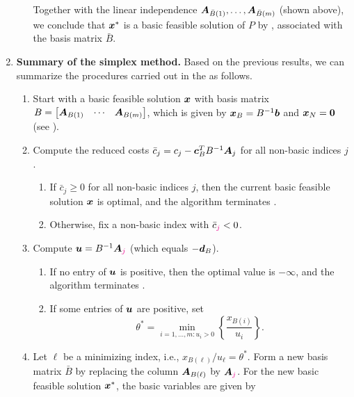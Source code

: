 \begin{enumerate}
\begin{pf}
\begin{enumerate}
Together with the linear independence
\(\bm{A}_{\bar{B}(1)},\dotsc,\bm{A}_{\bar{B}(m)}\) (shown above), we
conclude that \(\bm{x}^*\) is a basic feasible solution of \(P\) by
, associated with the basis matrix \(\bar{B}\).
\end{enumerate}
\end{pf}
\item \label{it:simplex-method-algo} \textbf{Summary of the simplex method.}
Based on the previous results, we can summarize the procedures carried out in
the  as follows.
\begin{enumerate}[label={(\arabic*)}]
\item Start with a basic feasible solution \(\bm{x}\) with basis matrix \(B=\begin{bmatrix}
\bm{A}_{B(1)}&\cdots&\bm{A}_{B(m)}\end{bmatrix}\), which is given by
\(\bm{x}_{B}=B^{-1}\bm{b}\) and \(\bm{x}_N=\bm{0}\) (see
).
\item Compute the reduced costs
\(\bar{c}_j=c_j-\bm{c}_{B}^{T}B^{-1}\bm{A}_j\) for all non-basic indices
\(j\).
\begin{enumerate}
\item If \(\bar{c}_j\ge 0\) for all non-basic indices \(j\), then the current
basic feasible solution \(\bm{x}\) is optimal, and the algorithm terminates
.
\item Otherwise, fix a non-basic index  with \(\bar{c}_{\mgc{j}}<0\).
\end{enumerate}
\item Compute \(\vect{u}=B^{-1}\vect{A}_{\mgc{j}}\) (which equals
\(-\bm{d}_{B}\)).
\begin{enumerate}
\item If no entry of \(\bm{u}\) is positive, then the optimal value is
\(-\infty\), and the algorithm terminates .
\item If some entries of \(\bm{u}\) are positive, set
\[
\theta^{*}=\min_{i=1,\dotsc,m:u_i>0}\left\{\frac{x_{B(i)}}{u_i}\right\}.
\]
\end{enumerate}
\item Let \(\ell\) be a minimizing index, i.e.,
\(x_{B(\ell)}/u_{\ell}=\theta^{*}\). Form a new basis matrix \(\bar{B}\) by
replacing the column \(\bm{A}_{B(\ell)}\) by \(\vect{A}_{\mgc{j}}\). For the new
basic feasible solution \(\bm{x}^*\), the basic variables are given by

\end{enumerate}
\end{enumerate}
